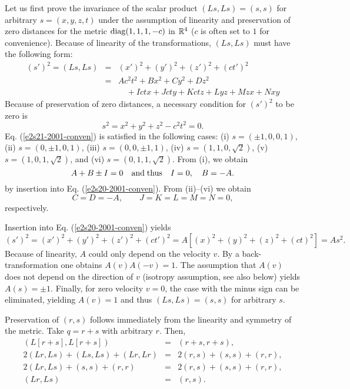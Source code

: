 Let us first prove the invariance of the scalar product
$(Ls,Ls)=(s,s)$ for arbitrary $s=(x,y,z,t)$
under the assumption of linearity and preservation of zero distances for the metric
${\rm diag}(1,1,1,-c)$ in ${\Bbb R}^4$ ($c$ is often set to $1$ for convenience).
Because of linearity of the transformations, $(Ls,Ls)$ must have the following form:
\begin{eqnarray}
(s')^2=(Ls,Ls)
&=&
(x')^2+(y')^2+(z')^2+(ct')^2
\nonumber \\
&=&
Ac^2t^2 + Bx^2+Cy^2+Dz^2
\nonumber \\
&&\quad
+Ictx+Jcty+Kctz+Lyz+Mzx+Nxy
\label{e2s20-2001-conven}
\end{eqnarray}
Because of preservation of zero distances,
a necessary condition for $(s')^2$ to be zero is
\begin{equation}
s^2=x^2+y^2+z^2-c^2t^2 =0.
\label{e2s21-2001-conven}
\end{equation}
Eq. (\ref{e2s21-2001-conven}) is satisfied in the following cases:
(i) $s=(\pm 1,0,0,1)$,
(ii) $s=(0,\pm 1,0,1)$,
(iii) $s=(0,0,\pm 1,1)$,
(iv) $s=(1,1,0,\sqrt{2})$,
(v) $s=(1,0,1,\sqrt{2})$,
and
(vi) $s=(0,1,1,\sqrt{2})$.
From (i), we obtain
\begin{equation}
A+B\pm I=0 \quad {\rm and \; thus}\quad
I=0,\quad B=-A.
\label{e2s22-2001-conven}
\end{equation}
by insertion into Eq. (\ref{e2s20-2001-conven}).
From (ii)--(vi) we obtain
\begin{equation}
C=D=-A,\qquad J=K=L=M=N=0,
\label{e2s23-2001-conven}
\end{equation}
respectively.

Insertion into Eq. (\ref{e2s20-2001-conven}) yields
\begin{equation}
(s')^2=
(x')^2+(y')^2+(z')^2+(ct')^2 =
A \left[(x)^2+(y)^2+(z)^2+(ct)^2\right] =A s^2.
\label{e2s24-2001-conven}
\end{equation}
Because of linearity, $A$ could only depend on the velocity $v$.
By a back-transformation one obtains $A(v)A(-v)=1$.
The assumption that $A(v)$ does not depend on the direction of $v$
(isotropy assumption, see also below)
yields $A(s)=\pm 1$.
Finally, for zero velocity $v=0$, the case with the minus sign can be eliminated,
yielding $A(v)=1$ and thus $(Ls,Ls)=(s,s)$ for arbitrary $s$.

Preservation of $(r,s)$ follows immediately from the linearity and symmetry of the metric.
Take $q= r+s$ with arbitrary $r$.
Then,
\begin{eqnarray}
(L[r+s],L[r+s])&=& (r+s,r+s),
\nonumber \\
2(Lr,Ls)+(Ls,Ls)+(Lr,Lr)&=&2(r,s) +(s,s)+ (r,r),
\nonumber \\
2(Lr,Ls) +(s,s)+ (r,r)&=&2(r,s) +(s,s)+ (r,r),
\nonumber \\
(Lr,Ls) &=&(r,s).
\nonumber
\end{eqnarray}


